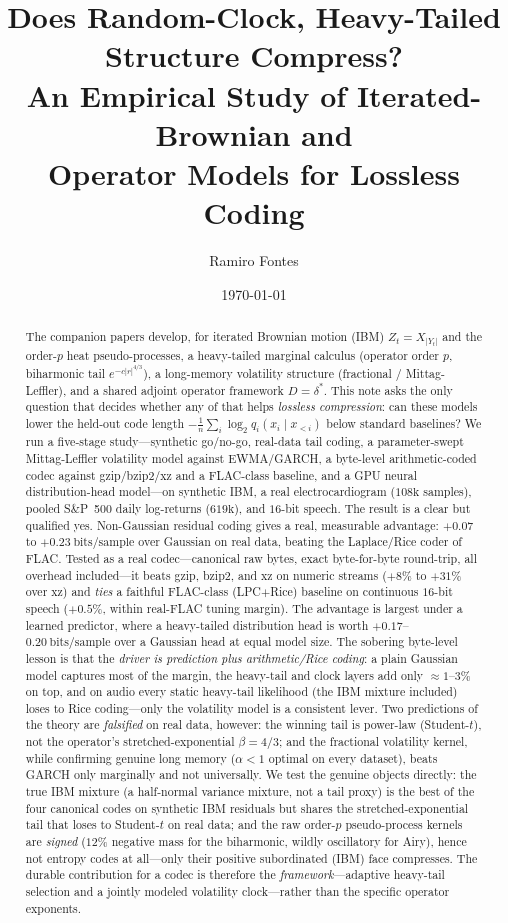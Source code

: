 \documentclass[11pt,reqno]{amsart}
\title[Does random-clock, heavy-tailed structure compress?]{Does Random-Clock, Heavy-Tailed Structure Compress?\\
  An Empirical Study of Iterated-Brownian and\\ Operator Models for Lossless Coding}
\author{Ramiro Fontes}
\date{\today}
\theoremstyle{plain}
\theoremstyle{definition}
\theoremstyle{remark}
\newcommand{\IBM}{Z}
\newcommand{\bps}{\mathrm{bits/sample}}
\begin{document}
\begin{abstract}
The companion papers develop, for iterated Brownian motion (IBM)
$\IBM_t=X_{|Y_t|}$ and the order-$p$ heat pseudo-processes, a heavy-tailed
marginal calculus (operator order $p$, biharmonic tail
$e^{-c|r|^{4/3}}$), a long-memory volatility structure (fractional /
Mittag-Leffler), and a shared adjoint operator framework $D=\delta^{*}$.
This note asks the only question that decides whether any of that helps
\emph{lossless compression}: can these models lower the held-out code length
$-\tfrac1n\sum_i\log_2 q_i(x_i\mid x_{<i})$ below standard baselines? We run a
five-stage study---synthetic go/no-go, real-data tail coding, a parameter-swept
Mittag-Leffler volatility model against EWMA/GARCH, a byte-level arithmetic-coded
codec against gzip/bzip2/xz and a FLAC-class baseline, and a GPU neural
distribution-head model---on synthetic IBM, a real electrocardiogram
($108\text{k}$ samples), pooled S\&P~500 daily log-returns ($619\text{k}$), and
$16$-bit speech. The result is a clear but qualified yes. Non-Gaussian
residual coding gives a real, measurable advantage: $+0.07$ to $+0.23~\bps$
over Gaussian on real data, beating the Laplace/Rice coder of FLAC. Tested as a
real codec---canonical raw bytes, exact byte-for-byte round-trip, all overhead
included---it beats gzip, bzip2, and xz on numeric streams ($+8\%$ to $+31\%$
over xz) and \emph{ties} a faithful FLAC-class (LPC$+$Rice) baseline on
continuous $16$-bit speech ($+0.5\%$, within real-FLAC tuning margin). The
advantage is largest under a learned predictor, where a heavy-tailed
distribution head is worth $+0.17$--$0.20~\bps$ over a Gaussian head at equal
model size. The sobering byte-level lesson is that the \emph{driver is
prediction plus arithmetic/Rice coding}: a plain Gaussian model captures most of
the margin, the heavy-tail and clock layers add only $\approx1$--$3\%$ on top,
and on audio every static heavy-tail likelihood (the IBM mixture included) loses
to Rice coding---only the volatility model is a consistent lever. Two predictions of the theory are
\emph{falsified} on real data, however: the winning tail is power-law
(Student-$t$), not the operator's stretched-exponential $\beta=4/3$; and the
fractional volatility kernel, while confirming genuine long memory
($\alpha<1$ optimal on every dataset), beats GARCH only marginally and not
universally. We test the genuine objects directly: the true IBM mixture (a
half-normal variance mixture, not a tail proxy) is the best of the four
canonical codes on synthetic IBM residuals but shares the stretched-exponential
tail that loses to Student-$t$ on real data; and the raw order-$p$
pseudo-process kernels are \emph{signed} ($12\%$ negative mass for the
biharmonic, wildly oscillatory for Airy), hence not entropy codes at all---only
their positive subordinated (IBM) face compresses. The durable contribution for
a codec is therefore the
\emph{framework}---adaptive heavy-tail selection and a jointly modeled
volatility clock---rather than the specific operator exponents.
\end{abstract}
\end{document}
